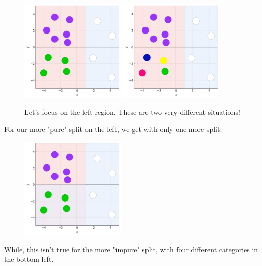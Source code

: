         \begin{figure}[H]
            \centering
            \includegraphics[width=50mm,scale=0.5]{images/nonparametric_images/pure_split.png}
            \includegraphics[width=50mm,scale=0.5]{images/nonparametric_images/impure_split.png}
            \caption*{Let's focus on the left region. These are two very different situations!}
        \end{figure}

        For our more "pure" split on the left, we get  with only one more split:

        \begin{figure}[H]
            \centering
            \includegraphics[width=50mm,scale=0.5]{images/nonparametric_images/perfect_split.png}
        \end{figure}

        While, this isn't true for the more "impure" split, with four different categories in the bottom-left.

